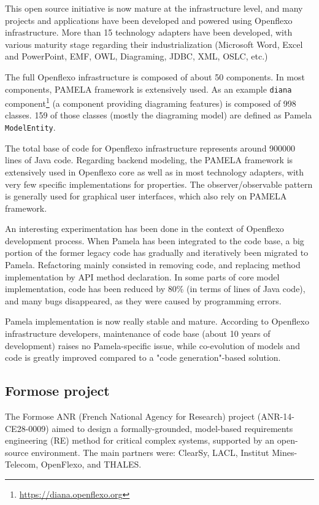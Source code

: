 This open source initiative is now mature at the infrastructure level, and many
projects and applications have been developed and powered using Openflexo
infrastructure. More than 15 technology adapters have been developed, with
various maturity stage regarding their industrialization (Microsoft Word, Excel
and PowerPoint, EMF, OWL, Diagraming, JDBC, XML, OSLC, etc.)

The full Openflexo infrastructure is composed of about 50 components. In most components, PAMELA framework is extensively used. As an example \texttt{diana} component\footnote{\url{https://diana.openflexo.org}} (a component providing diagraming features) is composed of 998 classes. 159 of those classes (mostly the diagraming model) are defined as Pamela \texttt{ModelEntity}. 

The total base of code for Openflexo infrastructure represents around
\num{900000} lines of Java code. Regarding backend modeling, the PAMELA
framework is extensively used in Openflexo core as well as in most technology
adapters, with very few specific implementations for properties. The
observer/observable pattern is generally used for graphical user interfaces,
which also rely on PAMELA framework. 

An interesting experimentation has been done in the context of Openflexo development process. When Pamela has been integrated to the code base, a big portion of the former legacy code has gradually and iteratively been migrated to Pamela. Refactoring mainly consisted in removing code, and replacing method implementation by API method declaration. In some parts of core model implementation, code has been reduced by 80\% (in terms of lines of Java code), and many bugs disappeared, as they were caused by programming errors.

Pamela implementation is now really stable and mature. According to Openflexo infrastructure developers, maintenance of code base (about 10 years of development) raises no Pamela-specific issue, while co-evolution of models and code is greatly improved compared to a "code generation"-based solution.


\subsection{Formose project}

The Formose ANR (French National Agency for Research) project
(ANR-14-CE28-0009)\cite{FormoseWebSite} aimed to design a formally-grounded,
model-based requirements engineering (RE) method for critical complex systems,
supported by an open-source environment. The main partners were: ClearSy, LACL,
Institut Mines-Telecom, OpenFlexo, and THALES. 

